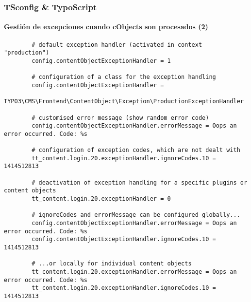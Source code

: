 \begin{frame}[fragile]
	\frametitle{TSconfig \& TypoScript}
	\framesubtitle{Gestión de excepciones cuando cObjects son procesados (2)}
	
	\lstset{
		basicstyle=\tiny\ttfamily
	}
	
	\begin{lstlisting}
		# default exception handler (activated in context "production")
		config.contentObjectExceptionHandler = 1

		# configuration of a class for the exception handling
		config.contentObjectExceptionHandler =
		  TYPO3\CMS\Frontend\ContentObject\Exception\ProductionExceptionHandler

		# customised error message (show random error code)
		config.contentObjectExceptionHandler.errorMessage = Oops an error occurred. Code: %s

		# configuration of exception codes, which are not dealt with
		tt_content.login.20.exceptionHandler.ignoreCodes.10 = 1414512813

		# deactivation of exception handling for a specific plugins or content objects
		tt_content.login.20.exceptionHandler = 0

		# ignoreCodes and errorMessage can be configured globally...
		config.contentObjectExceptionHandler.errorMessage = Oops an error occurred. Code: %s
		config.contentObjectExceptionHandler.ignoreCodes.10 = 1414512813

		# ...or locally for individual content objects
		tt_content.login.20.exceptionHandler.errorMessage = Oops an error occurred. Code: %s
		tt_content.login.20.exceptionHandler.ignoreCodes.10 = 1414512813
	\end{lstlisting}

\end{frame}

